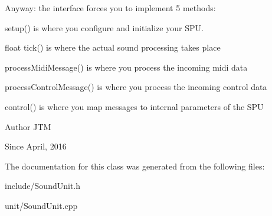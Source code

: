 Anyway\-: the interface forces you to implement 5 methods\-:


\begin{DoxyItemize}
\item setup() is where you configure and initialize your S\-P\-U.
\item float tick() is where the actual sound processing takes place
\item process\-Midi\-Message() is where you process the incoming midi data
\item process\-Control\-Message() is where you process the incoming control data
\item control() is where you map messages to internal parameters of the S\-P\-U
\end{DoxyItemize}

\begin{DoxyAuthor}{Author}
J\-T\-M 
\end{DoxyAuthor}
\begin{DoxySince}{Since}
April, 2016 
\end{DoxySince}


The documentation for this class was generated from the following files\-:\begin{DoxyCompactItemize}
\item 
include/Sound\-Unit.\-h\item 
unit/Sound\-Unit.\-cpp\end{DoxyCompactItemize}
